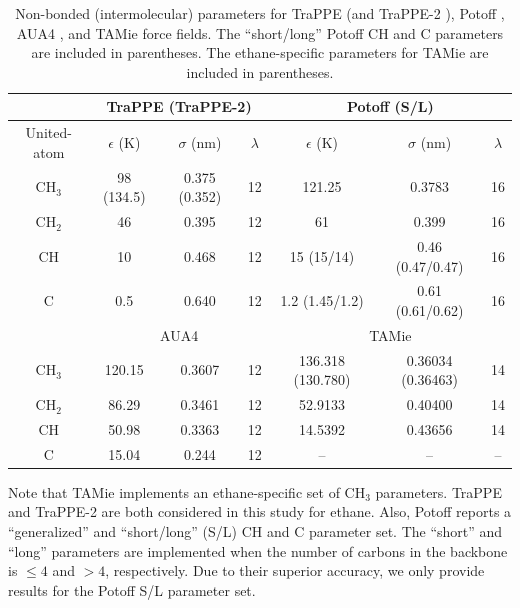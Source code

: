 \documentclass[preprint,review,12pt]{elsarticle}
\begin{document}
	\begin{table}[h!]
		\caption{Non-bonded (intermolecular) parameters for TraPPE \cite{TraPPE,Martin1999} (and TraPPE-2 \cite{TraPPEUA2}), Potoff \cite{Mie,Potoff_branched}, AUA4 \cite{AUA4,Nieto2008}, and TAMie \cite{TAMie,Weidler2016} force fields. The ``short/long'' Potoff CH and C parameters are included in parentheses. The ethane-specific parameters for TAMie are included in parentheses.} \label{tab:nonbonded params}
		\begin{center}
			\begin{tabular}{|c|c|c|c|c|c|c|}
				\hline
				\multicolumn{1}{|c}{} & \multicolumn{3}{|c}{TraPPE  (TraPPE-2)} & \multicolumn{3}{|c|}{Potoff (S/L)}  \\ \hline
				United-atom & $\epsilon$ (K) & $\sigma$ (nm) & $\lambda$ & $\epsilon$ (K) & $\sigma$ (nm) & $\lambda$ \\ \hline
				CH$_3$ & 98 (134.5)  & 0.375 (0.352) & 12 & 121.25 & 0.3783 & 16  \\ 
				CH$_2$ & 46 & 0.395 & 12 & 61 & 0.399 & 16 \\ 
				CH & 10 & 0.468 & 12 & 15 (15/14) & 0.46 (0.47/0.47) & 16\\
				C & 0.5 & 0.640 & 12 & 1.2 (1.45/1.2) & 0.61 (0.61/0.62) & 16\\
				\hline
				\multicolumn{1}{|c}{} & \multicolumn{3}{|c}{AUA4} & \multicolumn{3}{|c|}{TAMie} \\ \hline
				CH$_3$ & 120.15  & 0.3607 & 12 & 136.318 (130.780) & 0.36034 (0.36463) & 14 \\ 
				CH$_2$ & 86.29 & 0.3461 & 12 & 52.9133 & 0.40400 & 14 \\ 
				CH & 50.98 & 0.3363 & 12 & 14.5392 & 0.43656 & 14\\
				C & 15.04 & 0.244 & 12 & -- & -- & --\\
				\hline
			\end{tabular}
		\end{center} 
	\end{table}

    Note that TAMie implements an ethane-specific set of CH$_3$ parameters. TraPPE and TraPPE-2 are both considered in this study for ethane. Also, Potoff reports a ``generalized'' and ``short/long'' (S/L) CH and C parameter set. The ``short'' and ``long'' parameters are implemented when the number of carbons in the backbone is $\le 4$ and $> 4$, respectively. Due to their superior accuracy, we only provide results for the Potoff S/L parameter set.
    
\end{document}
